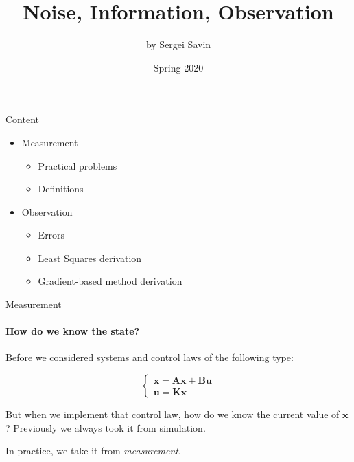 \documentclass{beamer}
\title{Noise, Information, Observation}
\author{by Sergei Savin}
\date{Spring 2020}
\begin{document}
\maketitle


\begin{frame}{Content}
\begin{itemize}
\item Measurement
\begin{itemize}
\item Practical problems
\item Definitions
\end{itemize}
\item Observation
\begin{itemize}
\item Errors
\item Least Squares derivation
\item Gradient-based method derivation
\end{itemize}
\end{itemize}
\end{frame}

\begin{frame}{Measurement}
\framesubtitle{How do we know the state?}
\begin{flushleft}

Before we considered systems and control laws of the following type:

\[
\begin{cases}
\dot {\mathbf x} = \mathbf A \mathbf x + \mathbf B \mathbf u\\
\mathbf u = \mathbf K \mathbf x
\end{cases}
\]

But when we implement that control law, how do we know the current value of $\mathbf x$? Previously we always took it from simulation. 

\bigskip

In practice, we take it from \emph{measurement}.

\end{flushleft}
\end{frame}
\end{document}

